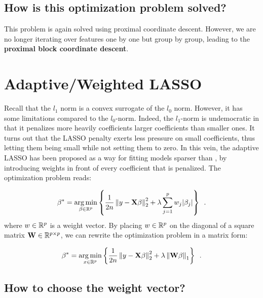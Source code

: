 \documentclass[a4paper,10pt]{article}
\theoremstyle{definition}
\begin{document}
\subsection*{How is this optimization problem solved?}

This problem is again solved using proximal coordinate descent. However, we are no longer iterating over features one by one but group by group, leading to the \textbf{proximal block coordinate descent}.

\section{Adaptive/Weighted LASSO}
\label{section_3}

Recall that the $l_1$ norm is a convex surrogate of the $l_0$ norm. However, it has some limitations compared to
the $l_0$-norm. Indeed, the $l_1$-norm is undemocratic in that it penalizes more heavily coefficients larger coefficients than smaller ones. It turns out that the LASSO penalty exerts less pressure on small coefficients,
thus letting them being small while not setting them to zero. In this vein, the adaptive LASSO has been proposed as a way for fitting models sparser than , by introducing weights in front of every coefficient that is
penalized. The optimization problem reads:

\begin{equation*}
    \beta^* = \operatorname*{arg\,min}_{\beta \in \mathbb{R}^p}
        \left\{
            \frac{1}{2n} \left \lVert  y - \mathbf{X}\beta \right \rVert_2^2
            + \lambda \sum_{j=1}^p w_j \lvert \beta_j \rvert
        \right\}
    \enspace .
\end{equation*}
%
where $w \in \mathbb{R}^p$ is a weight vector. By placing $w \in \mathbb{R}^p$ on the diagonal of a square matrix $\mathbf{W} \in \mathbb{R}^{p \times p}$, we can rewrite the optimization problem in a matrix form:

\begin{equation*}
    \beta^* = \operatorname*{arg\,min}_{x \in \mathbb{R}^p}
        \left\{
            \frac{1}{2n} \left \lVert y - \mathbf{X}\beta \right \rVert_2^2
            + \lambda \left \lVert \mathbf{W}\beta \right \rVert_1
        \right\}
    \enspace .
\end{equation*}
%
\subsection*{How to choose the weight vector?}
\end{document}
